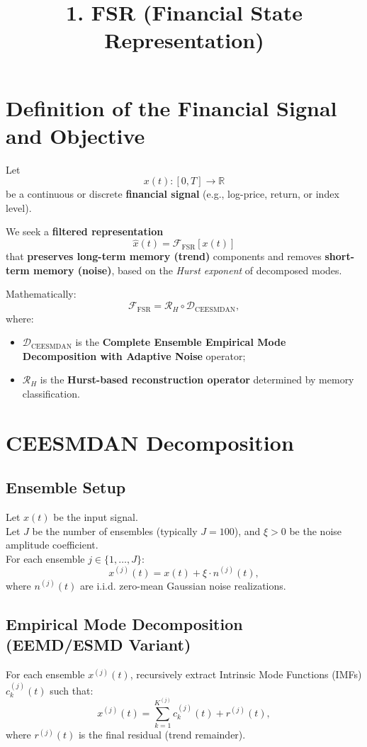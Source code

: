 \documentclass[11pt]{article}
\title{1. FSR (Financial State Representation)}
\author{}
\date{}
\begin{document}
\maketitle

\tableofcontents
\newpage

\section{Definition of the Financial Signal and Objective}
Let
\[
x(t): [0,T] \to \mathbb{R}
\]
be a continuous or discrete \textbf{financial signal} (e.g., log-price, return, or index level).

We seek a \textbf{filtered representation}
\[
\hat{x}(t) = \mathcal{F}_{\text{FSR}}[x(t)]
\]
that \textbf{preserves long-term memory (trend)} components and removes \textbf{short-term memory (noise)}, based on the \textit{Hurst exponent} of decomposed modes.

Mathematically:
\[
\mathcal{F}_{\text{FSR}} = \mathcal{R}_H \circ \mathcal{D}_{\text{CEESMDAN}},
\]
where:

\begin{itemize}
  \item $\mathcal{D}_{\text{CEESMDAN}}$ is the \textbf{Complete Ensemble Empirical Mode Decomposition with Adaptive Noise} operator;
  \item $\mathcal{R}_H$ is the \textbf{Hurst-based reconstruction operator} determined by memory classification.
\end{itemize}



\section{CEESMDAN Decomposition}

\subsection{Ensemble Setup}
Let $x(t)$ be the input signal.\\
Let $J$ be the number of ensembles (typically $J = 100$), and $\xi > 0$ be the noise amplitude coefficient.\\
For each ensemble $j \in \{1,\dots,J\}$:
\[
x^{(j)}(t) = x(t) + \xi \cdot n^{(j)}(t),
\]
where $n^{(j)}(t)$ are i.i.d. zero-mean Gaussian noise realizations.

\subsection{Empirical Mode Decomposition (EEMD/ESMD Variant)}
For each ensemble $x^{(j)}(t)$, recursively extract Intrinsic Mode Functions (IMFs) $c^{(j)}_k(t)$ such that:
\[
x^{(j)}(t) = \sum_{k=1}^{K^{(j)}} c^{(j)}_k(t) + r^{(j)}(t),
\]
where $r^{(j)}(t)$ is the final residual (trend remainder).
\end{document}
